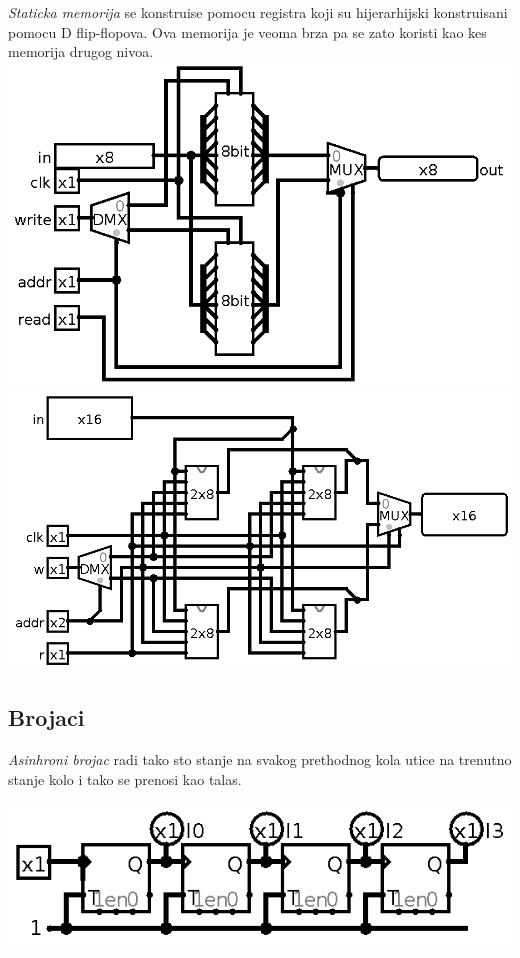 \documentclass[12p,a4paper]{article}
\begin{document}
\begin{multicols}{2}
    \emph{Staticka memorija} se konstruise pomocu registra koji su 
    hijerarhijski konstruisani pomocu D flip-flopova. Ova memorija je veoma
    brza pa se zato koristi kao kes memorija drugog nivoa.
    \includegraphics[width=\columnwidth]{Figures/mem28.png}
    \includegraphics[width=\columnwidth]{Figures/mem416.png}

    \subsection{Brojaci}

    \emph{Asinhroni brojac} radi tako sto stanje na svakog prethodnog kola
    utice na trenutno stanje kolo i tako se prenosi kao talas.

    \includegraphics[width=0.8\columnwidth]{Figures/asinhroni.png}


\end{multicols}
\end{document}
